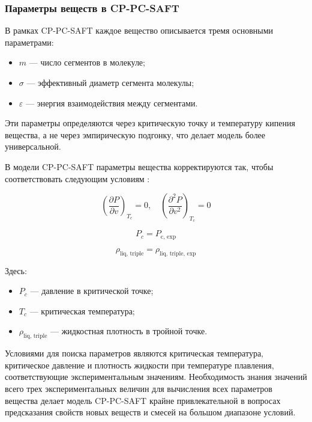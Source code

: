 \documentclass[a4paper,12pt]{article}
\begin{document}
\subsubsection{Параметры веществ  в CP-PC-SAFT}

В рамках CP-PC-SAFT каждое вещество описывается тремя основными параметрами:
\begin{itemize}
    \item \( m \) — число сегментов в молекуле;
    \item \( \sigma \) — эффективный диаметр сегмента молекулы;
    \item \( \varepsilon \) — энергия взаимодействия между сегментами.
\end{itemize}

Эти параметры определяются через критическую точку и температуру кипения вещества, а не через эмпирическую подгонку, что делает модель более универсальной.

В модели CP-PC-SAFT параметры вещества корректируются так, чтобы соответствовать следующим условиям \cite{polishuk2014standardized}:

\begin{equation}
\left( \frac{\partial P}{\partial v} \right)_{T_c} = 0, \quad
\left( \frac{\partial^2 P}{\partial v^2} \right)_{T_c} = 0
\end{equation}

\begin{equation}
P_c = P_{\text{c, exp}}
\end{equation}

\begin{equation}
\rho_{\text{liq, triple}} = \rho_{\text{liq, triple, exp}}
\end{equation}

Здесь:
\begin{itemize}
    \item \( P_c \) — давление в критической точке;
    \item \( T_c \) — критическая температура;
    \item \( \rho_{\text{liq, triple}} \) — жидкостная плотность в тройной точке.
\end{itemize}

Условиями для поиска параметров являются критическая температура, критическое давление и плотность жидкости при температуре плавления, соответствующие экспериментальным значениям. Необходимость знания значений всего трех экспериментальных величин для вычисления всех параметров вещества делает модель CP-PC-SAFT крайне привлекательной в вопросах предсказания свойств новых веществ и смесей на большом диапазоне условий. 
\end{document}
